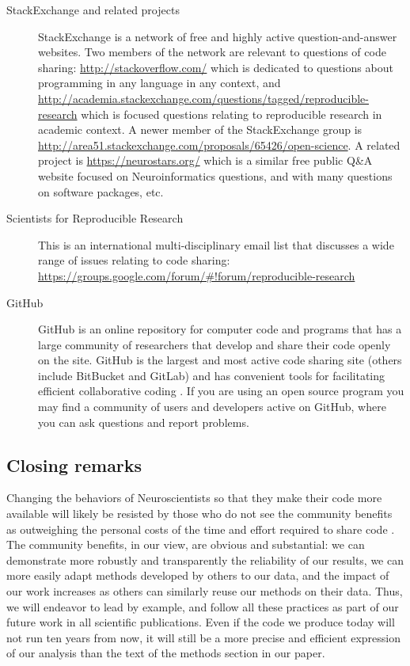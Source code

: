 \documentclass[11pt]{article}
\begin{document}
\begin{description}

\item [StackExchange and related projects] StackExchange is a network of free and highly active question-and-answer websites.  Two members of the network are relevant to questions of code sharing: \url{http://stackoverflow.com/} which is dedicated to questions about programming in any language in any context, and \url{http://academia.stackexchange.com/questions/tagged/reproducible-research} which is focused questions relating to reproducible research in academic context. A newer member of the StackExchange group is \url{http://area51.stackexchange.com/proposals/65426/open-science}. A related project is \url{https://neurostars.org/} which is a similar free public Q\&A website focused on Neuroinformatics questions, and with many questions on software packages, etc. 

\item [Scientists for Reproducible Research] This is an international multi-disciplinary email list that discusses a wide range of issues relating to code sharing: \url{https://groups.google.com/forum/#!forum/reproducible-research}

\item [GitHub] GitHub is an online repository for computer code and programs that has a large community of researchers that develop and share their code openly on the site. GitHub is the largest and most active code sharing site (others include BitBucket and GitLab) and has convenient tools for facilitating efficient collaborative coding \cite{tippmann2014my}. If you are using an open source program you may find a community of users and developers active on GitHub, where you can ask questions and report problems.

\end{description}


\subsection*{Closing remarks}

Changing the behaviors of Neuroscientists so that they make their code more available will likely be resisted by those who do not see the community benefits as outweighing the personal costs of the time and effort required to share code \cite{stodden2010scientific}. The community benefits, in our view, are obvious and substantial: we can demonstrate more robustly and transparently the reliability of our results, we can more easily adapt methods developed by others to our data, and the impact of our work increases as others can similarly reuse our methods on their data. Thus, we will endeavor to lead by example, and follow all these practices as part of our future work in all scientific publications. Even if the code we produce today will not run ten years from now, it will still be a more precise and efficient expression of our analysis than the text of the methods section in our paper. 
\end{document}
